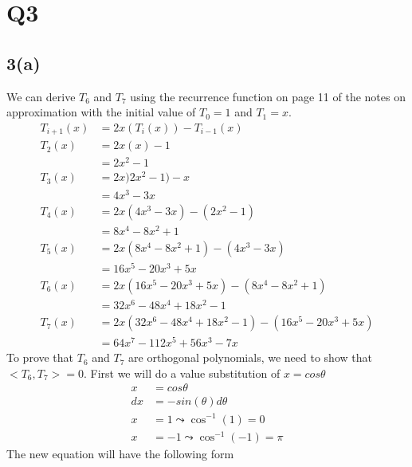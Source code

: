 \documentclass{article}
\begin{document}
\section{Q3}
\subsection*{3(a)}
We can derive $T_6$ and $T_7$ using the recurrence function on page 11 of the notes on approximation with the initial value of $T_0 = 1$ and $T_1 = x$.
\begin{equation*}
\begin{aligned}
T_{i+1}(x) &= 2x(T_{i}(x)) - T_{i-1}(x)\\
T_2(x) &= 2x(x) - 1\\
&= 2x^2-1\\
T_3(x) &=2x)2x^2-1)-x\\
&=4x^3 -3x\\
T_4(x) &=2x(4x^3-3x)-(2x^2-1)\\
&=8x^4-8x^2+1\\
T_5(x) &=2x(8x^4-8x^2+1) - (4x^3 -3x)\\
&=16x^5 - 20x^3 + 5x\\
T_6(x) &=2x(16x^5 - 20x^3 + 5x) - (8x^4-8x^2+1)\\
&=32x^6-48x^4+18x^2-1\\
T_7(x) &= 2x(32x^6-48x^4+18x^2-1) - (16x^5 - 20x^3 + 5x)\\
&=64x^7 - 112x^5 + 56x^3 - 7x
\end{aligned}
\end{equation*}
To prove that $T_6$ and $T_7$ are orthogonal polynomials, we need to show that $<T_6,T_7> = 0$. First we will do a value substitution of $x = cos \theta$
\begin{equation*}
\begin{aligned}
x &= cos \theta\\
dx &= - sin(\theta) d\theta\\
x &= 1 \leadsto \cos^{-1}(1) = 0\\
x &= -1 \leadsto \cos^{-1}(-1) = \pi
\end{aligned}
\end{equation*}
The new equation will have the following form
\end{document}
